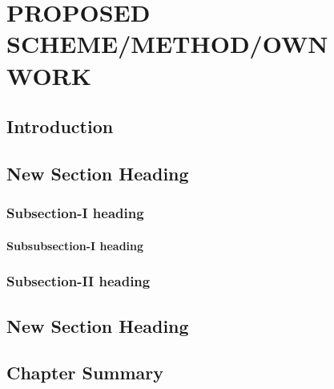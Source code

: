 \chapter{PROPOSED SCHEME/METHOD/OWN WORK}
\label{chap3:my-work}

%
%


\section{Introduction}
\label{Chapt3-sec-introduction}



\section{New Section Heading}
\label{Chapt3-sec-1}






\subsection{Subsection-I heading}	
\label{Chapt3-subsec-1}

\subsubsection{Subsubsection-I heading}	
\label{Chapt3-subsubsec-1}

\subsection{Subsection-II heading}	
\label{Chapt3-subsec-2}

\section{New Section Heading}
\label{Chap3-sec-2}




\section{Chapter Summary}
\label{chap3-sec:summary}

